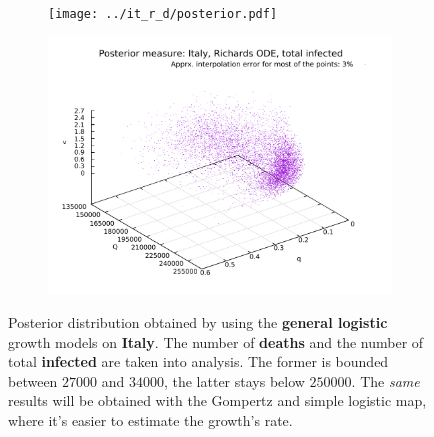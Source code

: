 \documentclass[8pt]{article}
\begin{document}
\begin{figure}[h!]
  \centering
  \begin{subfigure}[b]{0.48\linewidth}
  \texttt{[image: ../it\_r\_d/posterior.pdf]}
  \end{subfigure}
  \begin{subfigure}[b]{0.48\linewidth}
    \includegraphics[width=\linewidth]{../it_r_t/posterior.pdf}
  \end{subfigure}
	\caption{Posterior distribution obtained by using the
	\textbf{general logistic} growth models on \textbf{Italy}. 
	The number of \textbf{deaths}
	and the number of total \textbf{infected} are taken into analysis.
	The former is bounded between $27000$ and
	$34000$, the latter stays below $250000$. The \emph{same}
	results will be obtained with the Gompertz and simple logistic map,
	where it's easier to estimate the growth's rate.}
\end{figure}
\end{document}
